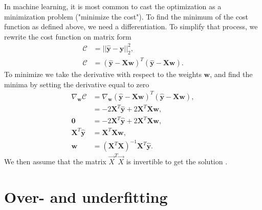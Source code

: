 In machine learning, it is most common to cast the optimization as a minimization problem
("minimize the cost"). To find the minimum of the cost function as defined above, we need
a differentiation. To simplify that process, we rewrite the cost function on matrix form
\begin{align*}
\mathcal{C} &= || \boldsymbol{\hat{y}} - \boldsymbol{y} ||_2 ^2, \\
\mathcal{C} &= ( \boldsymbol{\hat{y}} - \boldsymbol{Xw})^T( \boldsymbol{\hat{y}} - \boldsymbol{Xw}).
\end{align*}
To minimize we take the derivative with respect to the weights $\boldsymbol{w}$,
and find the minima by setting the derivative equal to zero
\begin{align}
\nabla _{\boldsymbol{w}}\mathcal{C} &= \nabla _{\boldsymbol{w}} ( \boldsymbol{\hat{y}} - \boldsymbol{Xw})^T( \boldsymbol{\hat{y}} - \boldsymbol{Xw}), \\
&= -2\boldsymbol{X}^T\boldsymbol{\hat{y}} + 2\boldsymbol{X}^T\boldsymbol{X}\boldsymbol{w}, \\
\boldsymbol{0} &= -2\boldsymbol{X}^T\boldsymbol{\hat{y}} + 2\boldsymbol{X}^T\boldsymbol{X}\boldsymbol{w}, \\
\boldsymbol{X}^T\boldsymbol{\hat{y}} &= \boldsymbol{X}^T\boldsymbol{X}\boldsymbol{w}, \\
\boldsymbol{w} &=(\boldsymbol{X}^T\boldsymbol{X})^{-1} \boldsymbol{X}^T\boldsymbol{\hat{y}}. \label{eq:ols}
\end{align}
We then assume that the matrix \(\vec{X}^T\vec{X}\)
is invertible to get the solution \cite{James2000}.

\section{Over- and underfitting}


